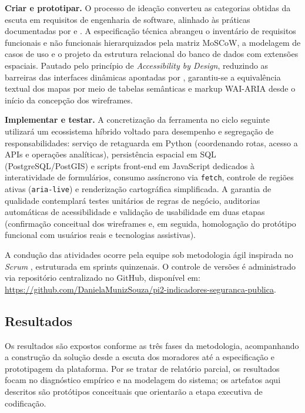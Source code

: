 \documentclass[
    12pt,
    oneside,            %
    a4paper,
    brazilian
    ]{abntex2}
\begin{document}
\textbf{Criar e prototipar.} O processo de ideação converteu as categorias obtidas da escuta em
requisitos de engenharia de software, alinhado às práticas documentadas por  e . A especificação técnica abrangeu o inventário de requisitos funcionais e não funcionais hierarquizados pela matriz MoSCoW, a modelagem de casos de uso e o projeto da estrutura relacional do banco de dados com extensões espaciais. Pautado pelo princípio de \emph{Accessibility by Design}, reduzindo as barreiras das interfaces dinâmicas apontadas por
, garantiu-se a equivalência textual dos mapas por meio de
tabelas semânticas e markup WAI-ARIA desde o início da concepção dos wireframes.

\textbf{Implementar e testar.} A concretização da ferramenta no ciclo seguinte utilizará um
ecossistema híbrido voltado para desempenho e segregação de responsabilidades: serviço de retaguarda em Python (coordenando rotas, acesso a APIs e operações analíticas), persistência espacial em SQL (PostgreSQL/PostGIS) e scripts front-end em JavaScript dedicados à interatividade de formulários, consumo assíncrono via \texttt{fetch}, controle de regiões ativas (\texttt{aria-live}) e renderização cartográfica simplificada. A garantia de qualidade contemplará testes unitários de regras de negócio, auditorias automáticas de acessibilidade e validação de usabilidade em duas etapas (confirmação conceitual dos wireframes e, em seguida, homologação do protótipo funcional com usuários reais e tecnologias assistivas).

A condução das atividades ocorre pela equipe sob metodologia ágil inspirada no
\emph{Scrum} \cite{sommerville2018}, estruturada em sprints quinzenais. O controle de versões é
administrado via repositório centralizado no GitHub, disponível em:
\url{https://github.com/DanielaMunizSouza/pi2-indicadores-seguranca-publica}.

\subsection{Resultados}
Os resultados são expostos conforme as três fases da metodologia, acompanhando a construção da solução desde a escuta dos moradores até a especificação e prototipagem da plataforma. Por se tratar de relatório parcial, os resultados focam no diagnóstico empírico e na modelagem do sistema; os artefatos aqui descritos são protótipos conceituais que orientarão a etapa executiva de codificação.
\end{document}
